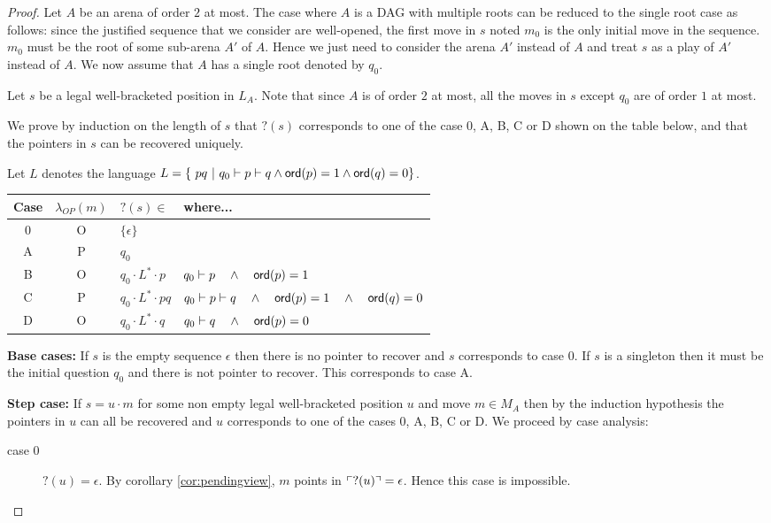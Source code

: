 \begin{proof}
Let $A$ be an arena of order $2$ at most.
The case where $A$ is a DAG with multiple roots can be reduced to the single root case as follows:
since the justified sequence that we consider are well-opened, the first move in $s$ noted $m_0$ is the only initial move in the sequence.
$m_0$ must be the root of some sub-arena $A'$ of $A$. Hence we just need to consider the arena $A'$ instead of $A$ and treat $s$ as a play
of $A'$ instead of $A$. We now assume that $A$ has a single root denoted by $q_0$.

Let $s$ be a legal well-bracketed position in $L_A$.
Note that since $A$ is of order $2$ at most, all the moves in $s$ except $q_0$ are of order $1$ at most.

We prove by induction on the length of $s$ that $?(s)$
corresponds to one of the case 0, A, B, C or D shown on the table below, and that the pointers in
$s$ can be recovered uniquely.

Let $L$ denotes the language $L = \{\ p q \ | \ q_0 \vdash p \vdash q \wedge {\sf ord}(p)=1 \wedge {\sf ord}(q) = 0 \}$.
\begin{center}
\begin{tabular}{c|c|l|l}
Case & $\lambda_{OP}(m)$ & $?(s) \in$ & where... \\ \hline
0 & O & $\{ \epsilon \}$ \\
A & P & $q_0$ \\
B & O & $q_0 \cdot L^* \cdot p$     & $q_0 \vdash p \quad \wedge\quad  {\sf ord}(p)=1$ \\ %
C & P & $q_0 \cdot L^* \cdot p q$ & $q_0 \vdash p \vdash q \quad \wedge\quad  {\sf ord}(p)=1 \quad \wedge\quad  {\sf ord}(q) = 0$ \\ %
D & O & $q_0 \cdot L^* \cdot q$      & $q_0 \vdash q \quad \wedge\quad  {\sf ord}(p) = 0$ \\ %
\end{tabular}
\end{center}


\noindent \textbf{Base cases:}
If $s$ is the empty sequence $\epsilon$ then there is no pointer to
recover and $s$ corresponds to case 0.
If $s$ is a singleton then it must be the initial question $q_0$ and
there is not pointer to recover. This corresponds to case A.

\noindent \textbf{Step case:}
If $s = u \cdot m$ for some non empty legal well-bracketed position $u$ and move $m \in M_A$
then by the induction hypothesis the pointers in $u$ can all be recovered and $u$ corresponds to one of the
cases 0, A, B, C or D.
We proceed by case analysis:
\begin{description}
\item[case 0] $?(u) = \epsilon$. By corollary \ref{cor:pendingview}, $m$ points in $\ulcorner ?(u) \urcorner = \epsilon$.
                Hence this case is impossible.


\end{description}
\end{proof}
